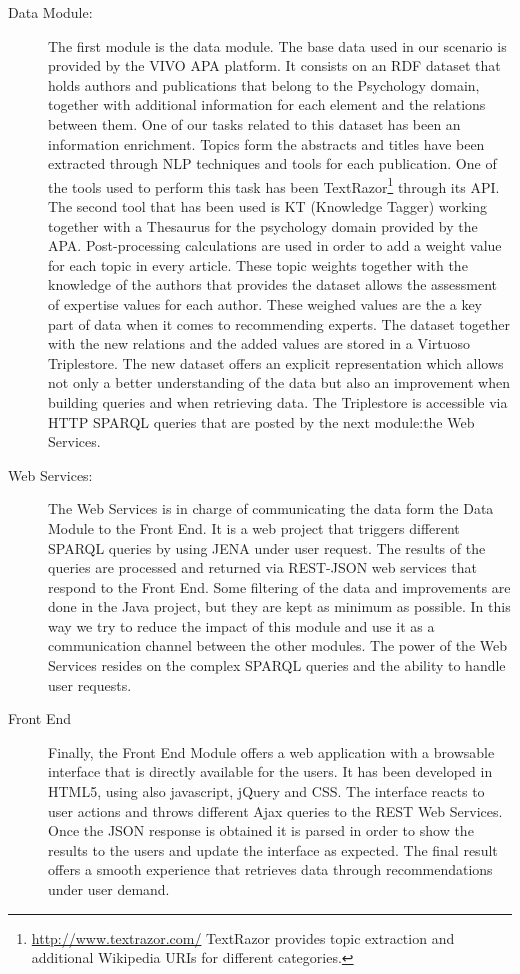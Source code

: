 \begin{description}
  \item[Data Module:] The first module is the data module. The base data used in our scenario is provided by the VIVO APA platform. It consists on an RDF dataset that holds authors and publications that belong to the Psychology domain, together with additional information for each element and the relations between them. One of our tasks related to this dataset has been an information enrichment. Topics form the abstracts and titles have been extracted through NLP techniques and tools for each publication. One of the tools used to perform this task has been TextRazor\footnote{\url{http://www.textrazor.com/} TextRazor provides topic extraction and additional Wikipedia URIs for different categories.} through its API. The second tool that has been used is KT (Knowledge Tagger) working together with a Thesaurus for the psychology domain provided by the APA. Post-processing calculations are used in order to add a weight value for each topic in every article. These topic weights together with the knowledge of the authors that provides the dataset allows the assessment of expertise values for each author. These weighed values are the a key part of data when it comes to recommending experts. The dataset together with the new relations and the added values are stored in a Virtuoso Triplestore. The new dataset offers an explicit representation which allows not only a better understanding of the data but also an improvement when building queries and when retrieving data. The Triplestore is accessible via HTTP SPARQL queries that are posted by the next module:the Web Services.
  \item[Web Services:] The Web Services is in charge of communicating the data form the Data Module to the Front End. It is a web project that triggers different SPARQL queries by using JENA under user request. The results of the queries are processed and returned via REST-JSON web services that respond to the Front End. Some filtering of the data and improvements are done in the Java project, but they are kept as minimum as possible. In this way we try to reduce the impact of this module and use it as a communication channel between the other modules. The power of the Web Services resides on the complex SPARQL queries and the ability to handle user requests.
  \item[Front End] Finally, the Front End Module offers a web application with a browsable interface that is directly available for the users. It has been developed in HTML5, using also javascript, jQuery and CSS. The interface reacts to user actions and throws different Ajax queries to the REST Web Services. Once the JSON response is obtained it is parsed in order to show the results to the users and update the interface as expected. The final result offers a smooth experience that retrieves data through recommendations under user demand.
\end{description}
